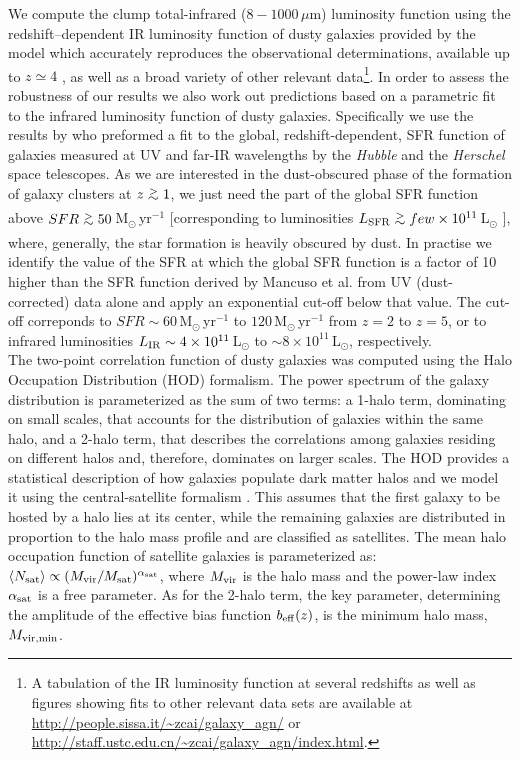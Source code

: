 \documentclass[useAMS,usenatbib]{mn2e}
\def\gsim{\,\lower2truept\hbox{${> \atop\hbox{\raise4truept\hbox{$\sim$}}}$}\,}
\begin{document}
We compute the clump total-infrared ($8-1000\,\mu$m) luminosity
function using the redshift--dependent IR luminosity function of dusty
galaxies provided by the \citet[][C13 hereafter]{Cai2013} model which accurately
reproduces the observational determinations, available up to $z\simeq
4$ \citep[see Fig.~1 of][]{Bonato2014}, as well as a broad variety of
other relevant data\footnote{A tabulation of the IR luminosity
  function at several redshifts as well as figures showing fits to
  other relevant data sets are available at
  \url{http://people.sissa.it/~zcai/galaxy_agn/} or
  \url{http://staff.ustc.edu.cn/~zcai/galaxy_agn/index.html}.}.
In order to assess the robustness of our results
  we also work out predictions based on a parametric fit to the
  infrared luminosity function of dusty galaxies. Specifically we
  use the results by \cite{Mancuso2016} who preformed a fit to the global, redshift-dependent, 
  SFR function of galaxies measured at UV and far-IR
  wavelengths by the {\it Hubble} and the {\it Herschel} space
  telescopes. As we are interested in the dust-obscured phase of the
  formation of galaxy clusters at $z\gsim1$, we just need the part of
  the global SFR function above $SFR\gsim50\,$M$_{\odot}\,$yr$^{-1}$ [corresponding to
  luminosities $L_{\rm SFR}\gsim few\times10^{11}\,$L$_{\odot}$
  \citep{KennicuttEvans2012}], where, generally, the star formation is heavily obscured by dust. In practise we identify the value of the SFR at which the global SFR function is a factor of 10
 higher than the SFR function derived by Mancuso et al. from UV
 (dust-corrected) data alone and apply an exponential cut-off below
 that value. The cut-off correponds to $SFR\sim60\,$M$_{\odot}$\,yr$^{-1}$ to $120$\,M$_{\odot}$\,yr$^{-1}$ from $z=2$ to
 $z=5$, or to infrared luminosities $L_{\rm
   IR}\sim4\times10^{11}\,$L$_{\odot}$ to
 $\sim8\times10^{11}\,$L$_{\odot}$, respectively. \\



The two-point correlation function of dusty galaxies was computed
using the Halo Occupation Distribution (HOD) formalism.  The
power spectrum of the galaxy distribution is parameterized as the sum
of two terms: a 1-halo term, dominating on small scales, that accounts for the
distribution of galaxies within the same halo, and a 2-halo term,
that describes the correlations among galaxies residing on
different halos and, therefore, dominates on larger scales. The HOD
provides a statistical description of how
galaxies populate dark matter halos and we model it using the
central-satellite formalism \citep[see, e.g.,][]{Zheng2005}. This
assumes that the first galaxy to be hosted by a halo lies at its
center, while the remaining galaxies
are distributed in proportion to the halo mass profile and are
classified as satellites. The mean halo
occupation function of satellite galaxies is parameterized as:
$\langle{N_{\rm sat}}\rangle \propto (M_{\rm vir}/M_{\rm
  sat})^{\alpha_{\rm sat}}$, where $M_{\rm vir}$ is the halo mass and
the power-law index $\alpha_{\rm sat}$ is a free parameter. As for 
the 2-halo term, the key parameter, determining the amplitude of the effective bias function
$b_{\rm eff}(z)$, is the minimum halo mass, $M_{\rm vir, min}$.
\end{document}
